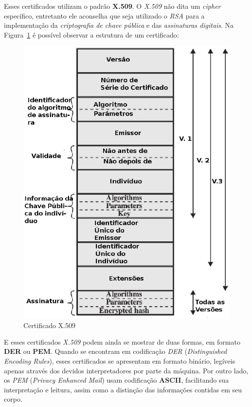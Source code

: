 	Esses certificados utilizam o padrão \textbf{X.509}. O \textit{X.509} não dita um \textit{cipher} específico, entretanto ele aconselha que seja utilizado o \textit{RSA} para a implementação da \textit{criptografia de chave pública} e das \textit{assinaturas digitais}. Na Figura~\ref{fig:img07} é possível observar a estrutura de um certificado:

	\begin{figure}[h]
		\centering
		\includegraphics[keepaspectratio=true,scale=0.7]{figuras/img04.eps}
		\caption{Certificado X.509 \cite[p.~431]{stallings11}}
		\label{fig:img07}
	\end{figure}

	E esses certificados \textit{X.509} podem ainda se mostrar de duas formas, em formato \textbf{DER} ou \textbf{PEM}. Quando se encontram em codificação \textit{DER} (\textit{Distinguished Encoding Rules}), esses certificados se apresentam em formato binário, legíveis apenas através dos devidos interpretadores por parte da máquina. Por outro lado, os \textit{PEM} (\textit{Privacy Enhanced Mail}) usam codificação \textbf{ASCII}, facilitando sua interpretação e leitura, assim como a distinção das informações contidas em seu corpo.

